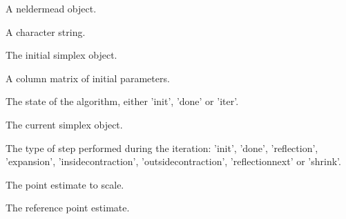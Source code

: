 \begin{Arguments}
\begin{ldescription}
\item[\code{this}] A neldermead object.
\item[\code{msg}] A character string.
\item[\code{simplex0}] The initial simplex object.
\item[\code{x0}] A column matrix of initial parameters.
\item[\code{state}] The state of the algorithm, either 'init', 'done' or 'iter'.
\item[\code{simplex}] The current simplex object.
\item[\code{step}] The type of step performed during the iteration: 'init', 'done',
'reflection', 'expansion', 'insidecontraction', 'outsidecontraction',
'reflectionnext' or 'shrink'.
\item[\code{x}] The point estimate to scale.
\item[\code{xref}] The reference point estimate.
\end{ldescription}
\end{Arguments}
%
